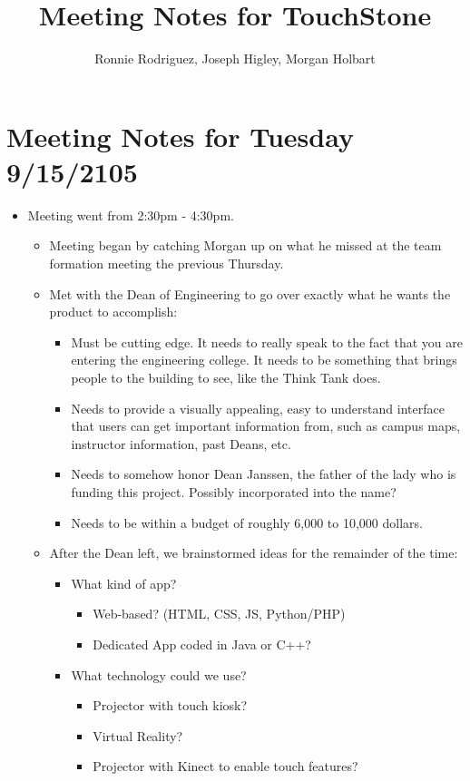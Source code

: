 \documentclass[]{article}
\title{Meeting Notes for TouchStone}
\author{Ronnie Rodriguez, Joseph Higley, Morgan Holbart}
\begin{document}
\maketitle

\section{Meeting Notes for Tuesday 9/15/2105}
	\begin{itemize}
		\item Meeting went from 2:30pm - 4:30pm.
	\begin{itemize}
		\item Meeting began by catching Morgan up on what he missed at the team formation meeting the previous Thursday.
		\item Met with the Dean of Engineering to go over exactly what he wants the product to accomplish:
			\begin{itemize}
				\item Must be cutting edge. It needs to really speak to the fact that you are entering the engineering college. It needs to be something that brings people to the building to see, like the Think Tank does.
				\item  Needs to provide a visually appealing, easy to understand interface that users can get important information from, such as campus maps, instructor information, past Deans, etc.
				\item Needs to somehow honor Dean Janssen, the father of the lady who is funding this project. Possibly incorporated into the name?
				\item Needs to be within a budget of roughly 6,000 to 10,000 dollars.
			\end{itemize}
		\item After the Dean left, we brainstormed ideas for the remainder of the time:
			\begin{itemize}
				\item What kind of app?
					\begin{itemize}
						\item Web-based? (HTML, CSS, JS, Python/PHP)
						\item Dedicated App coded in Java or C++?
					\end{itemize}
				\item What technology could we use?
					\begin{itemize}
						\item Projector with touch kiosk?
						\item Virtual Reality?
						\item Projector with Kinect to enable touch features?
					\end{itemize}
			\end{itemize}		
	\end{itemize}
	\end{itemize}
\end{document}
